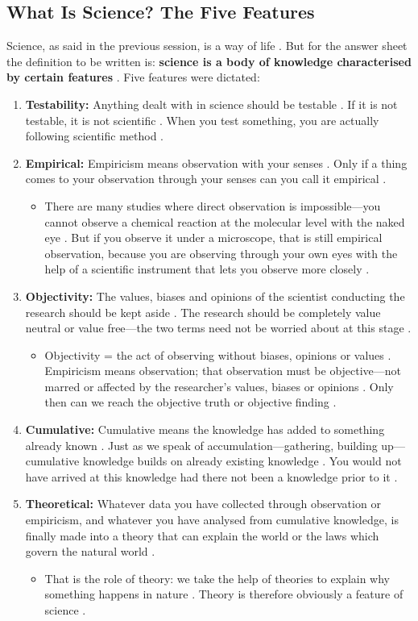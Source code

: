 \subsection{What Is Science? The Five Features}
Science, as said in the previous session, is a way of life . But for the answer sheet the definition to be written is: \textbf{science is a body of knowledge characterised by certain features} . Five features were dictated:
\begin{enumerate}
    \item \textbf{Testability:} Anything dealt with in science should be testable . If it is not testable, it is not scientific . When you test something, you are actually following scientific method .
    \item \textbf{Empirical:} Empiricism means observation with your senses . Only if a thing comes to your observation through your senses can you call it empirical .
    \begin{itemize}
        \item There are many studies where direct observation is impossible---you cannot observe a chemical reaction at the molecular level with the naked eye . But if you observe it under a microscope, that is still empirical observation, because you are observing through your own eyes with the help of a scientific instrument that lets you observe more closely .
    \end{itemize}
    \item \textbf{Objectivity:} The values, biases and opinions of the scientist conducting the research should be kept aside . The research should be completely value neutral or value free---the two terms need not be worried about at this stage .
    \begin{itemize}
        \item Objectivity = the act of observing without biases, opinions or values . Empiricism means observation; that observation must be objective---not marred or affected by the researcher's values, biases or opinions . Only then can we reach the objective truth or objective finding .
    \end{itemize}
    \item \textbf{Cumulative:} Cumulative means the knowledge has added to something already known . Just as we speak of accumulation---gathering, building up---cumulative knowledge builds on already existing knowledge . You would not have arrived at this knowledge had there not been a knowledge prior to it .
    \item \textbf{Theoretical:} Whatever data you have collected through observation or empiricism, and whatever you have analysed from cumulative knowledge, is finally made into a theory that can explain the world or the laws which govern the natural world .
    \begin{itemize}
        \item That is the role of theory: we take the help of theories to explain why something happens in nature . Theory is therefore obviously a feature of science .
    \end{itemize}
\end{enumerate}

